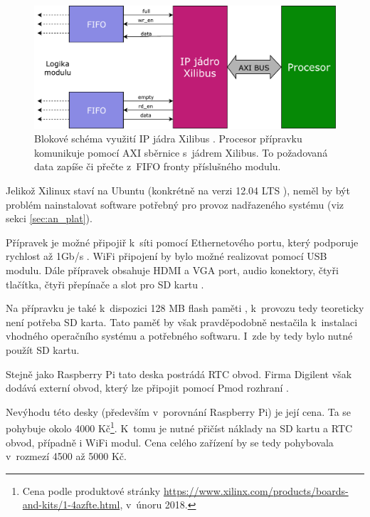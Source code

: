 \begin{figure}[h!]
    \centering
    \includegraphics[width=\textwidth]{images/xilibus.pdf}
    \caption[Blokové schéma využití IP jádra Xilibus]{Blokové schéma využití IP jádra Xilibus \cite{xilibus}. Procesor přípravku komunikuje pomocí AXI sběrnice s~jádrem Xilibus. To požadovaná data zapíše či přečte z~FIFO fronty příslušného modulu.}
    \label{fig:xilibus}
\end{figure}

Jelikož Xilinux staví na Ubuntu (konkrétně na verzi 12.04 LTS \cite{xilibus}), neměl by být problém nainstalovat software potřebný pro provoz nadřazeného systému (viz sekci \ref{sec:an_plat}). 

Přípravek je možné připojiř k~síti pomocí Ethernetového portu, který podporuje rychlost až 1Gb/s \cite{zybo_man}. WiFi připojení by bylo možné realizovat pomocí USB modulu. Dále přípravek obsahuje HDMI a VGA port, audio konektory, čtyři tlačítka, čtyři přepínače a slot pro SD kartu \cite{zybo_man}.

Na přípravku je také k~dispozici 128 MB flash paměti \cite{zybo_man}, k~provozu tedy teoreticky není potřeba SD karta. Tato paměť by však pravděpodobně nestačila k~instalaci vhodného operačního systému a potřebného softwaru. I~zde by tedy bylo nutné použít SD kartu.

Stejně jako Raspberry Pi tato deska postrádá RTC obvod. Firma Digilent však dodává externí obvod, který lze připojit pomocí Pmod rozhraní \cite{pmod_rtc_man}. 

Nevýhodu této desky (především v~porovnání Raspberry Pi) je její cena. Ta se pohybuje okolo 4000 Kč\footnote{Cena podle produktové stránky \url{https://www.xilinx.com/products/boards-and-kits/1-4azfte.html}, v~únoru 2018.}. K~tomu je nutné přičíst náklady na SD kartu a RTC obvod, případně i WiFi modul. Cena celého zařízení by se tedy pohybovala v~rozmezí 4500 až 5000 Kč.


